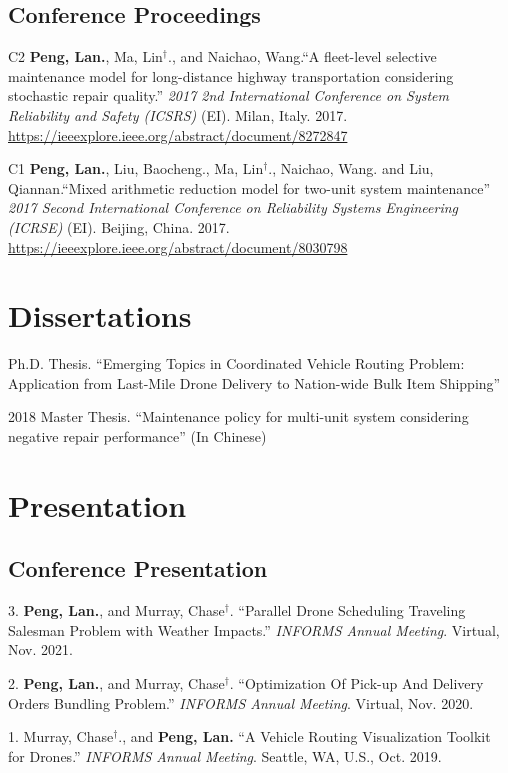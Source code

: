 \documentclass[12pt,letterpaper]{report}
\begin{document}
    \subsection*{Conference Proceedings}
    \begin{tablist}        
        \item[C2] \tab{}\textbf{Peng, Lan.}, Ma, Lin$^\dagger$., and Naichao, Wang.\enquote{A fleet-level selective maintenance model for long-distance highway transportation considering stochastic repair quality.} \textit{2017 2nd International Conference on System Reliability and Safety (ICSRS)} (EI). Milan, Italy. 2017. \href{https://ieeexplore.ieee.org/abstract/document/8272847}{https://ieeexplore.ieee.org/abstract/document/8272847}
        \item[C1] \tab{}\textbf{Peng, Lan.}, Liu, Baocheng., Ma, Lin$^\dagger$., Naichao, Wang. and Liu, Qiannan.\enquote{Mixed arithmetic reduction model for two-unit system maintenance} \textit{2017 Second International Conference on Reliability Systems Engineering (ICRSE)} (EI). Beijing, China. 2017. \href{https://ieeexplore.ieee.org/abstract/document/8030798}{https://ieeexplore.ieee.org/abstract/document/8030798}

    \end{tablist}

    \section*{Dissertations}
    \begin{tablist}
        \item[\the\year] \tab{} Ph.D. Thesis. \enquote{Emerging Topics in Coordinated Vehicle Routing Problem: Application from Last-Mile Drone Delivery to Nation-wide Bulk Item Shipping}
        \item[2018] \tab{} Master Thesis. \enquote{Maintenance policy for multi-unit system considering negative repair performance} (In Chinese)
    \end{tablist}

    \section*{Presentation}
    \subsection*{Conference Presentation}
    \begin{tablist}
        \item[3.] \tab{}\textbf{Peng, Lan.}, and Murray, Chase$^\dagger$. \enquote{Parallel Drone Scheduling Traveling Salesman Problem with Weather Impacts.} \textit{INFORMS Annual Meeting}. Virtual, Nov. 2021.
        \item[2.] \tab{}\textbf{Peng, Lan.}, and Murray, Chase$^\dagger$. \enquote{Optimization Of Pick-up And Delivery Orders Bundling Problem.} \textit{INFORMS Annual Meeting}. Virtual, Nov. 2020.
        \item[1.] \tab{}Murray, Chase$^\dagger$., and \textbf{Peng, Lan.} \enquote{A Vehicle Routing Visualization Toolkit for Drones.} \textit{INFORMS Annual Meeting}. Seattle, WA, U.S., Oct. 2019.
    \end{tablist}
\end{document}
